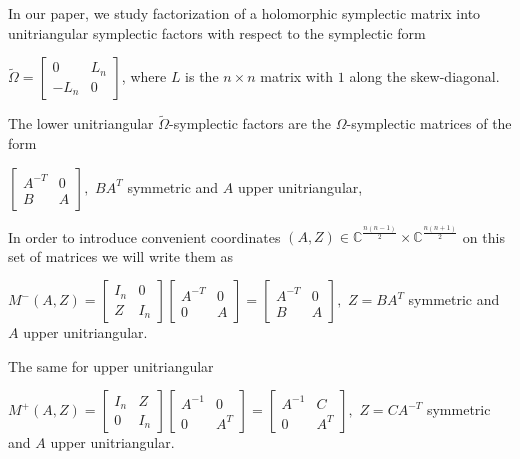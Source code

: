 \documentclass[10pt]{amsart}
\theoremstyle{remark}
\begin{document}
In our paper, we study factorization of a holomorphic symplectic matrix into unitriangular symplectic factors with respect to the symplectic form 
\begin{center}
    $\tilde{\Omega} = \left[\begin{array}{ccc}
        0 & L_n \\
        -L_n & 0
    \end{array}\right]$, where $L$ is the $n \times n$ matrix with $1$ along the skew-diagonal.
\end{center}
The lower unitriangular $\tilde{\Omega}$-symplectic factors are the $\Omega$-symplectic matrices of the form
\begin{center}
    $\left[\begin{array}{ccc} A^{-T} & 0 \\ B & A\end{array}\right],$  $B A^T$ symmetric and $A$ upper unitriangular,
\end{center} 
In order to introduce convenient coordinates $(A,Z) \in \mathbb{C}^{\frac{n(n-1)}{2}} \times  \mathbb{C}^{\frac{n(n+1)}{2}}$ on this set of matrices we  will write them as
\begin{center}
    $M^{-}(A,Z)  = \left[\begin{array}{ccc} I_n & 0 \\ Z & I_n\end{array}\right] \left[\begin{array}{ccc} A^{-T} & 0 \\ 0 & A\end{array}\right]= \left[\begin{array}{ccc} A^{-T} & 0 \\ B & A\end{array}\right],$ $Z = B A^T$ symmetric and $A$ upper unitriangular.
\end{center}
The same for upper unitriangular
\begin{center}
    $ M^{+}(A,Z)  = \left[\begin{array}{ccc} I_n & Z \\ 0 & I_n\end{array}\right] \left[\begin{array}{ccc} A^{-1} & 0 \\ 0 & A^T \end{array}\right] = \left[\begin{array}{ccc} A^{-1} & C \\ 0 & A^{T}\end{array}\right],$ $ Z = C A^{-T}$ symmetric and $A$ upper unitriangular.
\end{center}
\end{document}
